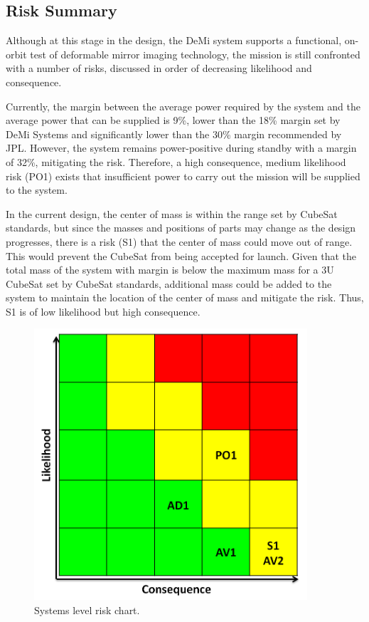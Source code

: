 \documentclass[12pt]{article}
\begin{document}
		\subsection{Risk Summary}

Although at this stage in the design, the DeMi system supports a functional, on-orbit test of deformable mirror imaging technology, the mission is still confronted with a number of risks, discussed in order of decreasing likelihood and consequence.  

Currently, the margin between the average power required by the system and the average power that can be supplied is 9\%, lower than the 18\% margin set by DeMi Systems and significantly lower than the 30\% margin recommended by JPL.  However, the system remains power-positive during standby with a margin of 32\%, mitigating the risk.  Therefore, a high consequence, medium likelihood risk (PO1) exists that insufficient power to carry out the mission will be supplied to the system. 

In the current design, the center of mass is within the range set by CubeSat standards, but since the masses and positions of parts may change as the design progresses, there is a risk (S1) that the center of mass could move out of range.  This would prevent the CubeSat from being accepted for launch.  Given that the total mass of the system with margin is below the maximum mass for a 3U CubeSat set by CubeSat standards, additional mass could be added to the system to maintain the location of the center of mass and mitigate the risk. Thus, S1 is of low likelihood but high consequence. 

\begin{figure}[ht]
\centering
\includegraphics[width=4in]{images/conclusion_1.png}
\caption{Systems level risk chart.}
\label{fig:risk_chart}
\end{figure}
\end{document}
